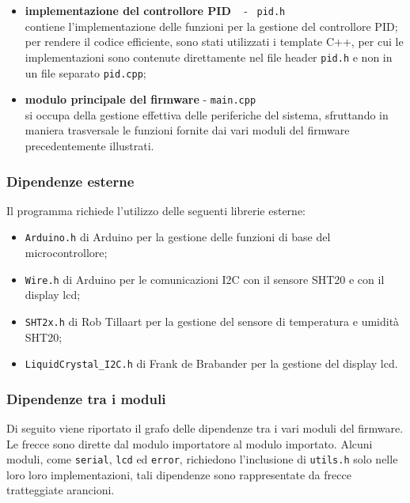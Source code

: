 \begin{itemize}
	\item \textbf{implementazione del controllore PID} ~ - ~\verb|pid.h| \\
	contiene l'implementazione delle funzioni per la gestione del controllore PID; per rendere il codice efficiente,
	sono stati utilizzati i template C++, per cui le implementazioni sono contenute direttamente nel file header
	\verb|pid.h| e non in un file separato \verb|pid.cpp|;
	\item \textbf{modulo principale del firmware} - \verb|main.cpp| \\
	si occupa della gestione effettiva delle periferiche del sistema, sfruttando in maniera trasversale le funzioni
	fornite dai vari moduli del firmware precedentemente illustrati.
\end{itemize}

\subsubsection{Dipendenze esterne}
Il programma richiede l'utilizzo delle seguenti librerie esterne:
\begin{itemize}
	\item \verb|Arduino.h| di Arduino per la gestione delle funzioni di base del microcontrollore;
	\item \verb|Wire.h| di Arduino per le comunicazioni I2C con il sensore SHT20 e con il display lcd;
	\item \verb|SHT2x.h| di Rob Tillaart \cite{sht2x_library} per la gestione del sensore di temperatura e umidità SHT20;
	\item \verb|LiquidCrystal_I2C.h| di Frank de Brabander \cite{lcd_library} per la gestione del display lcd.
\end{itemize}

\subsubsection{Dipendenze tra i moduli}
Di seguito viene riportato il grafo delle dipendenze tra i vari moduli del firmware. Le frecce sono dirette dal modulo
importatore al modulo importato. Alcuni moduli, come \verb|serial|, \verb|lcd| ed \verb|error|, richiedono l'inclusione
di \verb|utils.h| solo nelle loro loro implementazioni, tali dipendenze sono rappresentate da frecce tratteggiate arancioni.

